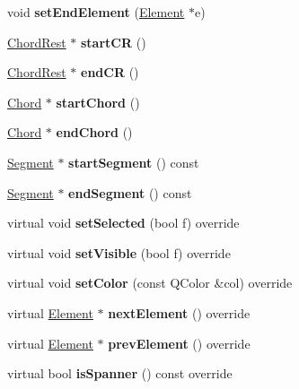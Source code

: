 \begin{DoxyCompactItemize}
void {\bfseries set\+End\+Element} (\hyperlink{class_ms_1_1_element}{Element} $\ast$e)
\item 
\mbox{\label{class_ms_1_1_spanner_a55786c568edbcf9796d5be5971f8eb12}} 
\hyperlink{class_ms_1_1_chord_rest}{Chord\+Rest} $\ast$ {\bfseries start\+CR} ()
\item 
\mbox{\label{class_ms_1_1_spanner_ad6858aab488742d20c542d35ac7bf7f1}} 
\hyperlink{class_ms_1_1_chord_rest}{Chord\+Rest} $\ast$ {\bfseries end\+CR} ()
\item 
\mbox{\label{class_ms_1_1_spanner_ab005cac85bfbd98348839a1cf148115a}} 
\hyperlink{class_ms_1_1_chord}{Chord} $\ast$ {\bfseries start\+Chord} ()
\item 
\mbox{\label{class_ms_1_1_spanner_a123a133c9aa96cc38b3487076e31a508}} 
\hyperlink{class_ms_1_1_chord}{Chord} $\ast$ {\bfseries end\+Chord} ()
\item 
\mbox{\label{class_ms_1_1_spanner_a6eabd5058febb1bca5c19d617cef9795}} 
\hyperlink{class_ms_1_1_segment}{Segment} $\ast$ {\bfseries start\+Segment} () const
\item 
\mbox{\label{class_ms_1_1_spanner_ad232e0c0945c9707feece29cbf7be2ac}} 
\hyperlink{class_ms_1_1_segment}{Segment} $\ast$ {\bfseries end\+Segment} () const
\item 
\mbox{\label{class_ms_1_1_spanner_a5cc7153e0e648b400f2bbafd42bf1a03}} 
virtual void {\bfseries set\+Selected} (bool f) override
\item 
\mbox{\label{class_ms_1_1_spanner_ae696ed7badf978974ec2e3cb5609d973}} 
virtual void {\bfseries set\+Visible} (bool f) override
\item 
\mbox{\label{class_ms_1_1_spanner_a88f80f057cd2b1f5b5dafee006c9bbe7}} 
virtual void {\bfseries set\+Color} (const Q\+Color \&col) override
\item 
\mbox{\label{class_ms_1_1_spanner_a74f5af429a41139fd75bae9916e8eb4a}} 
virtual \hyperlink{class_ms_1_1_element}{Element} $\ast$ {\bfseries next\+Element} () override
\item 
\mbox{\label{class_ms_1_1_spanner_ad007525314ca6ddd0d02fcaefe315064}} 
virtual \hyperlink{class_ms_1_1_element}{Element} $\ast$ {\bfseries prev\+Element} () override
\item 
\mbox{\label{class_ms_1_1_spanner_aa3deb11873dfa0f10ae02cd507e0a65e}} 
virtual bool {\bfseries is\+Spanner} () const override
\end{DoxyCompactItemize}
